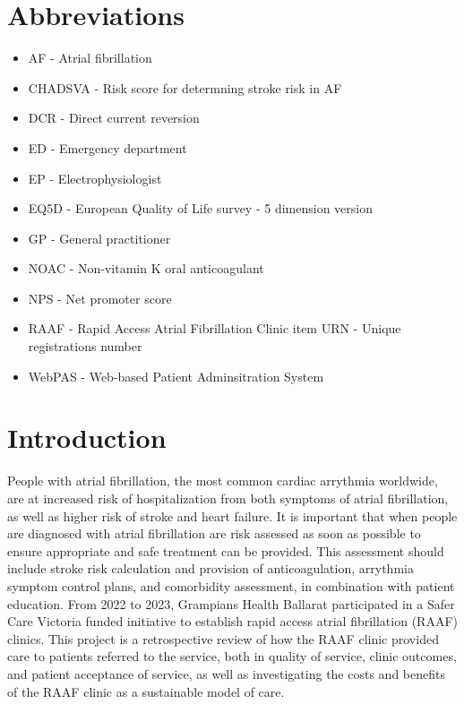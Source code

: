 \documentclass[11pt]{article}
\begin{document}
\section{Abbreviations}
\begin{itemize}
	\item AF - Atrial fibrillation
	\item CHADSVA - Risk score for determning stroke risk in AF
	\item DCR - Direct current reversion
	\item ED - Emergency department
	\item EP - Electrophysiologist	
	\item EQ5D - European Quality of Life survey - 5 dimension version
	\item GP - General practitioner
	\item NOAC - Non-vitamin K oral anticoagulant
	\item NPS - Net promoter score
	\item RAAF - Rapid Access Atrial Fibrillation Clinic	
	item URN - Unique registrations number
	\item WebPAS - Web-based Patient Adminsitration System
\end{itemize}
	

\pagebreak
		
\section{Introduction} \label{introduction}
People with atrial fibrillation, the most common cardiac arrythmia worldwide, are at increased risk of hospitalization from both symptoms of atrial fibrillation, as well as higher risk of stroke and heart failure. It is important that when people are diagnosed with atrial fibrillation are risk assessed as soon as possible to ensure appropriate and safe treatment can be provided. This assessment should include stroke risk calculation and provision of anticoagulation, arrythmia symptom control plans, and comorbidity assessment, in combination with patient education. From 2022 to 2023, Grampians Health Ballarat participated in a Safer Care Victoria funded initiative to establish rapid access atrial fibrillation (RAAF) clinics. This project is a retrospective review of how the RAAF clinic provided care to patients referred to the service, both in quality of service, clinic outcomes, and patient acceptance of service, as well as investigating the costs and benefits of the RAAF clinic as a sustainable model of care. 
\end{document}
